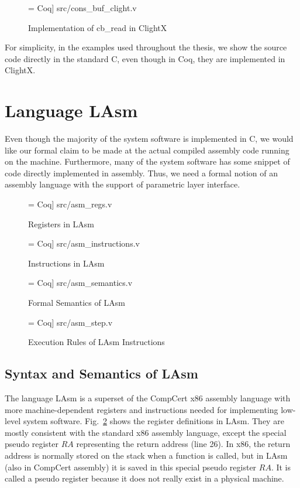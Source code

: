 \begin{figure}
 = Coq] {src/cons_buf_clight.v}
\caption{Implementation of \textsf{cb\_read} in ClightX}
\label{fig:clight_cb_read}
\end{figure}

For simplicity, in the examples used throughout the thesis, we show
the source code directly in the standard C, even though in Coq, they
are implemented in ClightX.


\section{Language LAsm}
Even though the majority of the system software is implemented in C,
we would like our formal claim to be made at the actual compiled assembly
code running on the machine. Furthermore, many of the system software
has some snippet of code directly implemented in assembly.
Thus, we need a formal notion of an assembly language with
the support of parametric layer interface.


\begin{figure}
 = Coq] {src/asm_regs.v}
\caption{Registers in LAsm}
\label{fig:lasm_regs}
\end{figure}

\begin{figure}
 = Coq] {src/asm_instructions.v}
\caption{Instructions in LAsm}
\label{fig:lasm_instructions}
\end{figure}

\begin{figure}
 = Coq] {src/asm_semantics.v}
\caption{Formal Semantics of LAsm}
\label{fig:lasm_semantics}
\end{figure}

\begin{figure}
 = Coq] {src/asm_step.v}
\caption{Execution Rules of LAsm Instructions}
\label{fig:lasm_step}
\end{figure}

\subsection{Syntax and Semantics of LAsm}

The language LAsm is a superset of the CompCert x86 assembly language with more
machine-dependent registers and instructions needed for implementing
low-level system software. 
Fig.~\ref{fig:lasm_regs} shows the register definitions in LAsm.
They are mostly consistent with the standard x86 assembly language,
except the special pseudo register $RA$ representing the return
address (line 26). In x86, the return address is normally stored
on the stack when a function is called, but in LAsm (also in
CompCert assembly) it is saved in this special pseudo register $RA$.
It is called a pseudo register because it does not really exist
in a physical machine. 

